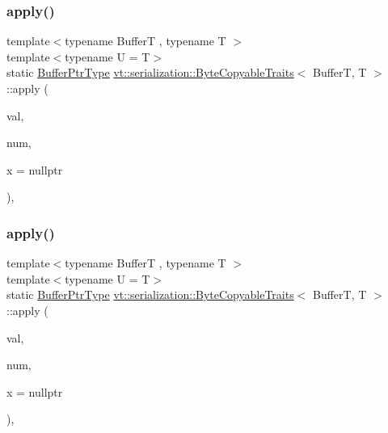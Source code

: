 \subsubsection{\texorpdfstring{apply()}{apply()}\hspace{0.1cm}{\footnotesize\ttfamily [3/4]}}
{\footnotesize\ttfamily template$<$typename BufferT , typename T $>$ \\
template$<$typename U  = T$>$ \\
static \hyperlink{structvt_1_1serialization_1_1_byte_copyable_traits_ab06bcaa790f4a227936f6d6854d2bf41}{Buffer\+Ptr\+Type} \hyperlink{structvt_1_1serialization_1_1_byte_copyable_traits}{vt\+::serialization\+::\+Byte\+Copyable\+Traits}$<$ BufferT, T $>$\+::apply (\begin{DoxyParamCaption}\item[{T $\ast$}]{val,  }\item[{Size\+Type}]{num,  }\item[{\hyperlink{structvt_1_1serialization_1_1_byte_copyable_traits_ac6700c34f3c9642a029d3d3857811f59}{is\+Tuple\+Type}$<$ U $>$ $\ast$}]{x = {\ttfamily nullptr} }\end{DoxyParamCaption})\hspace{0.3cm}{\ttfamily [inline]}, {\ttfamily [static]}}

\mbox{\label{structvt_1_1serialization_1_1_byte_copyable_traits_a7f61ed0ebf3f22db6f9aa8d4e3dd28ca}} 
\subsubsection{\texorpdfstring{apply()}{apply()}\hspace{0.1cm}{\footnotesize\ttfamily [4/4]}}
{\footnotesize\ttfamily template$<$typename BufferT , typename T $>$ \\
template$<$typename U  = T$>$ \\
static \hyperlink{structvt_1_1serialization_1_1_byte_copyable_traits_ab06bcaa790f4a227936f6d6854d2bf41}{Buffer\+Ptr\+Type} \hyperlink{structvt_1_1serialization_1_1_byte_copyable_traits}{vt\+::serialization\+::\+Byte\+Copyable\+Traits}$<$ BufferT, T $>$\+::apply (\begin{DoxyParamCaption}\item[{T $\ast$}]{val,  }\item[{Size\+Type}]{num,  }\item[{\hyperlink{structvt_1_1serialization_1_1_byte_copyable_traits_a9cbf2126e3b503513822b5f4f3dfa136}{is\+Not\+Byte\+Copy\+Type}$<$ U $>$ $\ast$}]{x = {\ttfamily nullptr} }\end{DoxyParamCaption})\hspace{0.3cm}{\ttfamily [inline]}, {\ttfamily [static]}}

